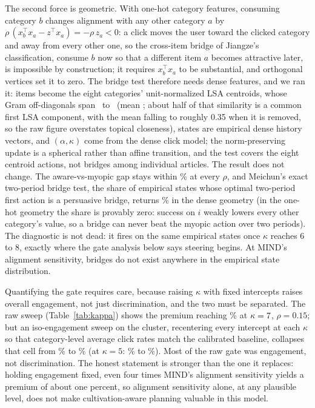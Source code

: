 \documentclass[11pt]{article}
\begin{document}
The second force is geometric. With one-hot category features, consuming
category $b$ changes alignment with any other category $a$ by
$\rho\,(x_b^\top x_a - z^\top x_a) = -\rho\, z_a < 0$: a click moves the
user toward the clicked category and away from every other one, so the
cross-item bridge of Jiangze's classification, consume $b$ now so that a
different item $a$ becomes attractive later, is impossible by construction; it requires
$x_b^\top x_a$ to be substantial, and orthogonal vertices set it to zero.
The bridge test therefore needs dense features, and we ran it: items become
the eight categories' unit-normalized LSA centroids, whose Gram
off-diagonals span \gramoffmin\ to \gramoffmax\ (mean \gramoffmean; about
half of that similarity is a common first LSA component, with the mean
falling to roughly 0.35 when it is removed, so the raw figure overstates
topical closeness), states are empirical dense history vectors, and
$(\alpha,\kappa)$ come from the dense click model; the norm-preserving
update is a spherical rather than affine transition, and the test covers
the eight centroid actions, not bridges among individual articles. The result does not change. The aware-vs-myopic gap
stays within \densegapmax\% at every $\rho$, and Meichun's exact two-period
bridge test, the share of empirical states whose optimal two-period first
action is a persuasive bridge, returns \bridgetwodense\% in the dense
geometry (in the one-hot geometry the share is provably zero: success on
$i$ weakly lowers every other category's value, so a bridge can never beat
the myopic action over two periods). The diagnostic is not dead: it fires
on the same empirical states once $\kappa$ reaches 6 to 8, exactly where
the gate analysis below says steering begins. At MIND's alignment
sensitivity, bridges do not exist anywhere in the empirical state
distribution.

Quantifying the gate requires care, because raising $\kappa$ with fixed
intercepts raises overall engagement, not just discrimination, and the two
must be separated. The raw sweep (Table~\ref{tab:kappa}) shows the premium
reaching \kgapmidpct\% at $\kappa=7$, $\rho=0.15$; but an
iso-engagement sweep on the cluster, recentering every intercept at each
$\kappa$ so that category-level average click rates match the calibrated
baseline, collapses that cell from \gaterawseven\% to \gateisoseven\%
(at $\kappa=5$: \gaterawfive\% to \gateisofive\%). Most of the raw
gate was engagement, not discrimination. The honest statement is stronger
than the one it replaces: holding engagement fixed, even four times MIND's
alignment sensitivity yields a premium of about one percent, so alignment
sensitivity alone, at any plausible level, does not make cultivation-aware
planning valuable in this model.
\end{document}

